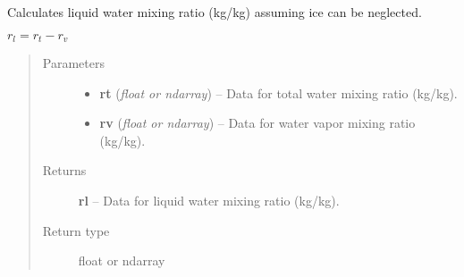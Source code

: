 \documentclass[letterpaper,10pt,english]{sphinxmanual}
\begin{document}
\begin{fulllineitems}
\label{atmos:atmos.equations.rl_from_rt_rv}
Calculates liquid water mixing ratio (kg/kg) assuming ice can be neglected.

\(r_l = r_t-r_v\)
\begin{quote}\begin{description}
\item[{Parameters}] \leavevmode\begin{itemize}
\item {} 
\textbf{rt} (\emph{float or ndarray}) -- Data for total water mixing ratio (kg/kg).

\item {} 
\textbf{rv} (\emph{float or ndarray}) -- Data for water vapor mixing ratio (kg/kg).

\end{itemize}

\item[{Returns}] \leavevmode
\textbf{rl} --
Data for liquid water mixing ratio (kg/kg).

\item[{Return type}] \leavevmode
float or ndarray

\end{description}\end{quote}

\end{fulllineitems}

\end{document}
